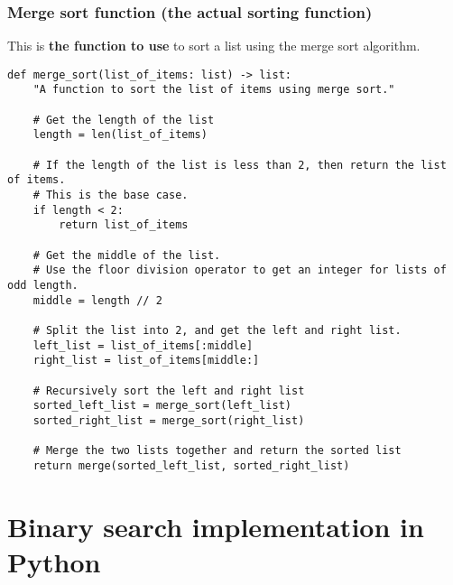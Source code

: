 \documentclass[11pt]{article}
\begin{document}
 \newpage

\subsubsection{Merge sort function (the actual sorting function)}
\label{sec:org00c0558}
This is \textbf{the function to use} to sort a list using the merge sort algorithm.
\begin{verbatim}
def merge_sort(list_of_items: list) -> list:
    "A function to sort the list of items using merge sort."

    # Get the length of the list
    length = len(list_of_items)

    # If the length of the list is less than 2, then return the list of items.
    # This is the base case.
    if length < 2:
        return list_of_items

    # Get the middle of the list.
    # Use the floor division operator to get an integer for lists of odd length.
    middle = length // 2

    # Split the list into 2, and get the left and right list.
    left_list = list_of_items[:middle]
    right_list = list_of_items[middle:]

    # Recursively sort the left and right list
    sorted_left_list = merge_sort(left_list)
    sorted_right_list = merge_sort(right_list)

    # Merge the two lists together and return the sorted list
    return merge(sorted_left_list, sorted_right_list)
\end{verbatim}

 \newpage

\section{Binary search implementation in Python}
\label{sec:org9ecbaff}
\end{document}
